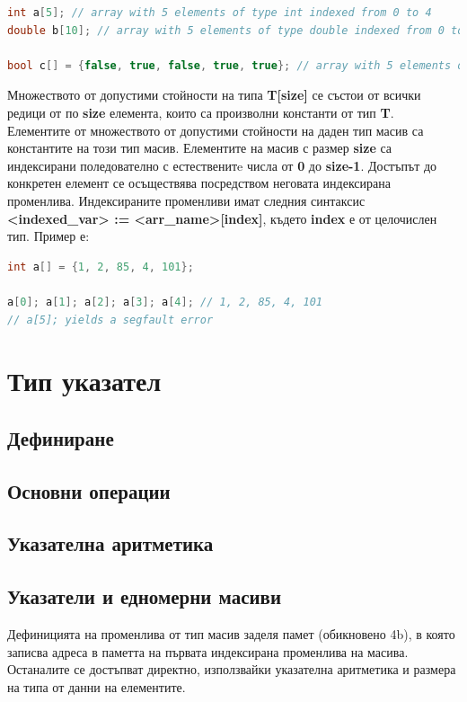\documentclass[fleqn,12pt]{article}
\begin{document}
\begin{lstlisting}[language=C++, caption=Example array definitions]
int a[5]; // array with 5 elements of type int indexed from 0 to 4
double b[10]; // array with 5 elements of type double indexed from 0 to 9

bool c[] = {false, true, false, true, true}; // array with 5 elements of type bool
\end{lstlisting}

Множеството от допустими стойности на типа \textbf{T[size]} се състои от всички редици от по \textbf{size} елемента, които са произволни константи от тип \textbf{T}.
Елементите от множеството от допустими стойности на даден тип масив са константите на този тип масив.
\bigbreak
Елементите на масив с размер \textbf{size} са индексирани поледователно с естественитe числа от \textbf{0} до \textbf{size-1}.
Достъпът до конкретен елемент се осъществява посредством неговата индексирана променлива.
Индексираните променливи имат следния синтаксис \textbf{<indexed\_var> := <arr\_name>[index]}, където \textbf{index} е от целочислен тип.
Пример е:

\begin{lstlisting}[language=C++, caption=Example array item access]
int a[] = {1, 2, 85, 4, 101};

a[0]; a[1]; a[2]; a[3]; a[4]; // 1, 2, 85, 4, 101
// a[5]; yields a segfault error
\end{lstlisting}

\section{Тип указател}
\subsection{Дефиниране}
\subsection{Основни операции}
\subsection{Указателна аритметика}
\subsection{Указатели и едномерни масиви}

Дефиницията на променлива от тип масив заделя памет (обикновено 4b), в която записва адреса в паметта на първата индексирана променлива на масива.
Останалите се достъпват директно, използвайки указателна аритметика и размера на типа от данни на елементите.
\end{document}
